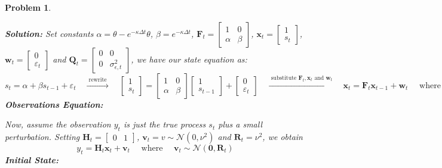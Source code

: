 \documentclass[11pt]{article}
\theoremstyle{plain} %
\newtheorem{problem}[theorem]{Problem}
\newenvironment{solution}
{\color{C2}\normalfont\begin{framed}\begingroup\textbf{Solution:} }
  {\endgroup\end{framed}}
\theoremstyle{remark}
\begin{document}
\begin{problem}
\begin{enumerate}[label=(\alph*)]
\begin{solution}
          Set constants $\alpha = \theta - e^{-\kappa\Delta t}\theta$, $\beta =
            e^{-\kappa\Delta t}$, $\mathbf{F}_t = \begin{bmatrix} 1      & 0     \\
                \alpha & \beta
            \end{bmatrix} $, $\mathbf{x}_t = \begin{bmatrix}
              1 \\
              s_t
            \end{bmatrix}$, $\mathbf{w}_t = \begin{bmatrix}
              0 \\
              \varepsilon_t
            \end{bmatrix} $
          and
          $\mathbf{Q}_{t} = \begin{bmatrix}
              0 & 0                      \\
              0 & \sigma_{\epsilon, t}^2
            \end{bmatrix}$, we have our state equation as:
          $$
            s_t = \alpha + \beta s_{t-1} + \varepsilon_t
            \quad \xrightarrow{ \text{ rewrite } } \quad
            \begin{bmatrix}
              1 \\
              s_t
            \end{bmatrix}
            =
            \begin{bmatrix}
              1      & 0     \\
              \alpha & \beta
            \end{bmatrix}
            \begin{bmatrix}
              1 \\
              s_{t-1}
            \end{bmatrix}
            + \begin{bmatrix}
              0 \\
              \varepsilon_t
            \end{bmatrix}
            \quad \xrightarrow{ \text{ substitute } \mathbf{F}_t, \mathbf{x}_t \text{ and } \mathbf{w}_t} \quad
            \mathbf{x}_t = \mathbf{F}_t\mathbf{x}_{t-1} + \mathbf{w}_t
            \quad  \text{ where } \quad
            \mathbf{w}_t \sim \mathcal{N}\left(\boldsymbol{0},  \mathbf{Q}_{t}\right)
          $$
          \textbf{Observations Equation:}

          Now, assume the observation $y_t$ is just the true process $s_t$ plus a small perturbation.
          Setting $\mathbf{H}_t = \begin{bmatrix}
              0 & 1
            \end{bmatrix}$, $\mathbf{v}_t = v \sim \mathcal{N}\left(0, \nu^2\right)$ and
          $\mathbf{R}_{t} = \nu^2$, we obtain
          $$
            y_t = \mathbf{H}_t\mathbf{x}_t + \mathbf{v}_t
            \quad  \text{ where } \quad
            \mathbf{v}_t \sim \mathcal{N}\left(\boldsymbol{0},  \mathbf{R}_{t}\right)
          $$
          \textbf{Initial State:}


\end{solution}
\end{enumerate}
\end{problem}
\end{document}
